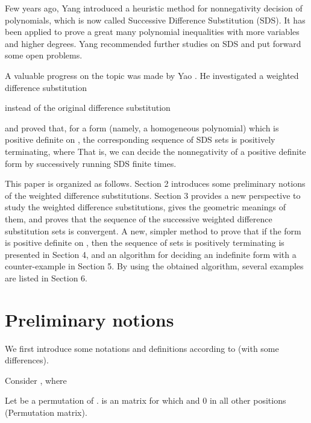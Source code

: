 \documentclass [10pt,a4paper]{article}
\begin{document}
Few years ago,  Yang \cite{Yang:1,Yang:2,Yang:3} introduced a
heuristic method for nonnegativity  decision of polynomials, which
is now called Successive Dif\mbox{}ference Substitution (SDS). It
has been applied to prove a great many polynomial inequalities with
more variables and higher degrees. Yang recommended  further studies
on
 SDS and  put forward some open problems.

 A valuable progress on the
 topic was made by Yao \cite{Yong:1}.  He investigated a weighted dif\mbox{}ference
 substitution
 
instead of the  original dif\mbox{}ference
 substitution

 
and proved that, for a form (namely, a homogeneous polynomial) which
is positive definite on , the corresponding sequence
of SDS sets is positively terminating, where
  That
is,  we can decide the nonnegativity of a positive definite form by
 successively running SDS finite times.

 This paper is organized as follows. Section 2
introduces some preliminary notions of the weighted
dif\mbox{}ference substitutions. Section 3 provides a new
perspective  to study the weighted dif\mbox{}ference substitutions,
gives the geometric meanings  of them, and  proves that the sequence
of the successive  weighted dif\mbox{}ference
 substitution sets
is convergent.  A new, simpler method to prove that if the form  
is positive def\mbox{}inite on , then the sequence
of sets  is positively
terminating is presented in Section 4, and an algorithm for deciding
an indef\mbox{}inite form with a counter-example in Section 5. By
using the obtained algorithm, several examples are listed in Section
6.





\section{Preliminary  notions}

We first introduce some notations and def\mbox{}initions according
to \cite{Yong:1} (with some differences).

  Consider ,  where


Let  be a permutation of .
 is an  matrix for
which  and 0 in
all other positions (Permutation matrix).

\end{document}
